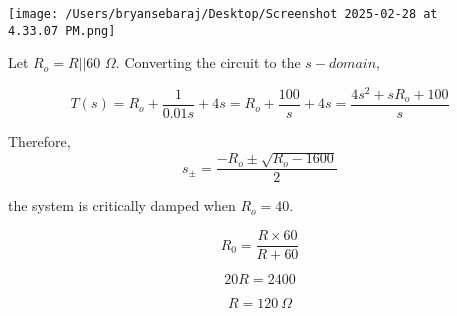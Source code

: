 \documentclass{article}
\begin{document}
\texttt{[image: /Users/bryansebaraj/Desktop/Screenshot 2025-02-28 at 4.33.07 PM.png]}

Let $R_o = R || 60$ $\Omega$. Converting the circuit to the $s-domain$, 

$$T(s) = R_o + \frac{1}{0.01s} + 4s = R_o + \frac{100}{s} + 4s= \frac{4s^2 + sR_o + 100}{s}$$

Therefore, 
$$s_\pm = \frac{-R_o \pm \sqrt{R_o - 1600}}{2}$$

the system is critically damped when $R_o = 40$. 

$$R_0 = \frac{R \times 60}{R + 60}$$

$$20R = 2400$$

$$R = 120 \ \Omega$$
\end{document}
